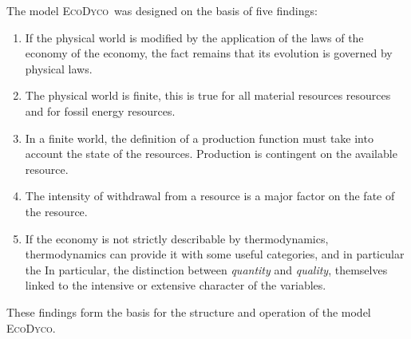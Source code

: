 \documentclass[12pt,a4paper]{article}%
\newcommand{\ed}{\textsc{EcoDyco}}
\begin{document}
The model \ed\ was designed on the basis of five findings:

\begin{enumerate}
	\item If the physical world is modified by the application of the laws of the economy
	of the economy, the fact remains that its evolution is governed by
	physical laws.
	
	\item The physical world is finite, this is true for all material resources
	resources and for fossil energy resources.
	
	\item In a finite world, the definition of a production function must take into account the state of the resources. Production is contingent on the available resource.
	
	\item The intensity of withdrawal from a resource is a major factor
	on the fate of the resource.
	
	\item If the economy is not strictly describable by thermodynamics,
	thermodynamics can provide it with some useful categories, and in particular the
	In particular, the distinction between \textit{quantity} and \textit{quality},
	themselves linked to the intensive or extensive character of the variables.
\end{enumerate}


\noindent These findings form the basis for the structure and operation of the model \ed.
\end{document}
